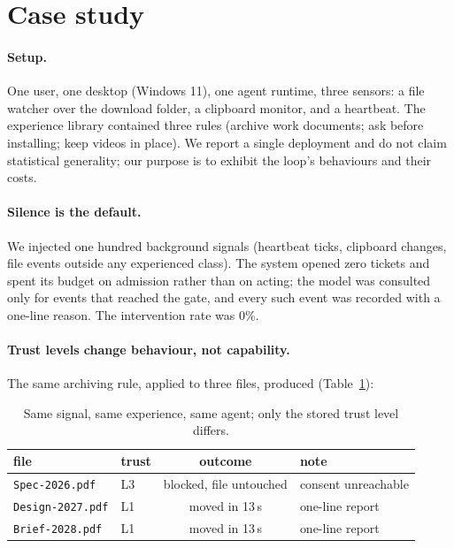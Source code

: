 \documentclass[10pt,a4paper]{article}
\begin{document}
\section{Case study}
\label{sec:case}

\paragraph{Setup.}
One user, one desktop (Windows 11), one agent runtime, three sensors: a file
watcher over the download folder, a clipboard monitor, and a heartbeat. The
experience library contained three rules (archive work documents; ask before
installing; keep videos in place). We report a single deployment and do not
claim statistical generality; our purpose is to exhibit the loop's behaviours
and their costs.

\paragraph{Silence is the default.}
We injected one hundred background signals (heartbeat ticks, clipboard
changes, file events outside any experienced class). The system opened zero
tickets and spent its budget on admission rather than on acting; the model
was consulted only for events that reached the gate, and every such event was
recorded with a one-line reason. The intervention rate was 0\%.

\paragraph{Trust levels change behaviour, not capability.}
The same archiving rule, applied to three files, produced (Table~\ref{tab:trust}):

\begin{table}[h]
\centering\small
\begin{tabular}{@{}llcl@{}}
\toprule
file & trust & outcome & note \\
\midrule
\texttt{Spec-2026.pdf} & L3 & blocked, file untouched & consent unreachable \\
\texttt{Design-2027.pdf} & L1 & moved in 13\,s & one-line report \\
\texttt{Brief-2028.pdf} & L1 & moved in 13\,s & one-line report \\
\bottomrule
\end{tabular}
\caption{Same signal, same experience, same agent; only the stored trust
level differs.}
\label{tab:trust}
\end{table}
\end{document}
